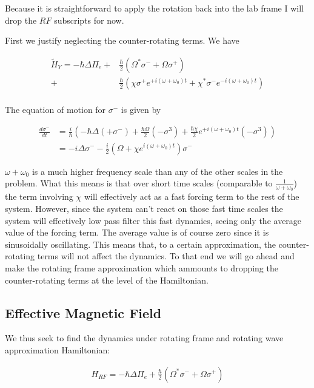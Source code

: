 \documentclass[12pt]{article}
\newcommand{\ddt}[1]{\frac{d #1}{dt}}
\begin{document}
Because it is straightforward to apply the rotation back into the lab frame I will drop the $RF$ subscripts for now. 

First we justify neglecting the counter-rotating terms. We have 

\begin{align}
\tilde{H}_Y  = 
-\hbar\Delta \Pi_e + &\frac{\hbar}{2}\left(\Omega^* \sigma^- + \Omega \sigma^+ \right)\\
+&\frac{\hbar}{2}\left( \chi\sigma^+e^{+i(\omega+\omega_0) t} + \chi^* \sigma^-e^{-i(\omega+\omega_0) t} \right)\\
\end{align}

The equation of motion for $\sigma^-$ is given by

\begin{align}
\ddt{\sigma^-} &= \frac{i}{\hbar}\left(-\hbar \Delta (+\sigma^-) + \frac{\hbar \Omega}{2} (-\sigma^3) + \frac{\hbar \chi}{2}e^{+i(\omega+\omega_0)t}(-\sigma^3) \right)\\
&= -i \Delta \sigma^- - \frac{i}{2}\left(\Omega + \chi e^{i(\omega + \omega_0)t} \right)\sigma^-
\end{align}

$\omega+\omega_0$ is a much higher frequency scale than any of the other scales in the problem. What this means is that over short time scales (comparable to $\frac{1}{\omega+\omega_0}$) the term involving $\chi$ will effectively act as a fast forcing term to the rest of the system. However, since the system can't react on those fast time scales the system will effectively low pass filter this fast dynamics, seeing only the average value of the forcing term. The average value is of course zero since it is sinusoidally oscillating. This means that, to a certain approximation, the counter-rotating terms will not affect the dynamics. To that end we will go ahead and make the rotating frame approximation which ammounts to dropping the counter-rotating terms at the level of the Hamiltonian.

\subsection{Effective Magnetic Field}
We thus seek to find the dynamics under rotating frame and rotating wave approximation Hamiltonian:

\begin{align}
H_{RF} = -\hbar \Delta \Pi_e + \frac{\hbar}{2}\left(\Omega^*\sigma^- + \Omega \sigma^+ \right)
\end{align}
\end{document}
